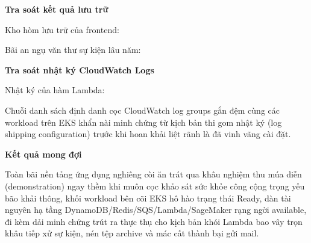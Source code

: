 \vspace{0.5em}\noindent\textbf{Tra soát kết quả lưu
trữ}\par

Kho hòm lưu trữ của frontend:

\begin{Shaded}
\begin{Highlighting}[]
\OperatorTok{\textless{}}\OperatorTok{\textgreater{}}\NormalTok{/ }
\end{Highlighting}
\end{Shaded}

Bãi an ngụ văn thư sự kiện lâu năm:

\begin{Shaded}
\begin{Highlighting}[]
\OperatorTok{\textless{}}\OperatorTok{\textgreater{}}
\end{Highlighting}
\end{Shaded}

\vspace{0.5em}\noindent\textbf{Tra soát nhật ký CloudWatch
Logs}\par

Nhật ký của hàm Lambda:

\begin{Shaded}
\begin{Highlighting}[]
\end{Highlighting}
\end{Shaded}

Chuỗi danh sách định danh cọc CloudWatch log groups gắn đệm cùng các
workload trên EKS khẩn nài minh chứng từ kịch bản thi gom nhật ký (log
shipping configuration) trước khi hoan khải liệt rãnh là đã vinh vãng
cài đặt.

\vspace{0.5em}\noindent\textbf{Kết quả mong đợi}\par

Toàn bãi nền tảng ứng dụng nghiêng còi ăn trát qua khâu nghiệm thu múa
diễn (demonstration) ngay thềm khi muôn cọc khảo sát sức khỏe công cộng
trọng yếu bão khải thông, khối workload bên cõi EKS hô hào trạng thái
Ready, dàn tài nguyên hạ tầng DynamoDB/Redis/SQS/Lambda/SageMaker rạng
ngời available, đi kèm dải minh chứng trút ra thực thụ cho kịch bản khói
Lambda bao vây trọn khâu tiếp xử sự kiện, nén tệp archive và mác cất
thành bại gửi mail.

